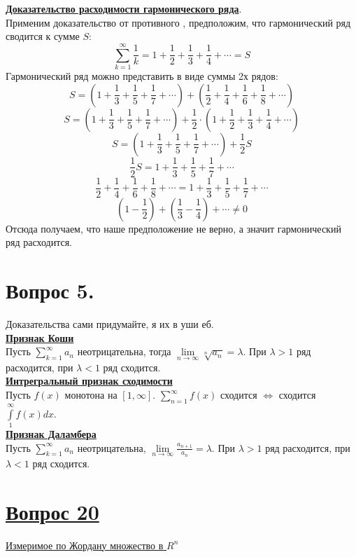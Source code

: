 \documentclass{report}
\begin{document}
\textbf{\uline{Доказательство расходимости гармонического ряда}}.\\
Применим доказательство от противного , предположим, что гармонический ряд сводится к сумме $S$:
$$\sum\limits_{k = 1}^\infty \frac{1}{k} = 1 + \frac{1}{2} + \frac{1}{3} + \frac{1}{4} + \cdots = S$$
Гармонический ряд можно представить в виде суммы 2х рядов:
$$S = (1 + \frac{1}{3} + \frac{1}{5} + \frac{1}{7} + \cdots) + (\frac{1}{2} + \frac{1}{4} + \frac{1}{6} + \frac{1}{8} + \cdots)$$
$$S = (1 + \frac{1}{3} + \frac{1}{5} + \frac{1}{7} + \cdots) + \frac{1}{2} \cdot (1 + \frac{1}{2} + \frac{1}{3} + \frac{1}{4} + \cdots)$$
$$S = (1 + \frac{1}{3} + \frac{1}{5} + \frac{1}{7} + \cdots) + \frac{1}{2}S$$
$$\frac{1}{2}S = 1 + \frac{1}{3} + \frac{1}{5} + \frac{1}{7} + \cdots$$
$$\frac{1}{2} + \frac{1}{4} + \frac{1}{6} + \frac{1}{8} + \cdots = 1 + \frac{1}{3} + \frac{1}{5} + \frac{1}{7} + \cdots$$
$$(1 - \frac{1}{2}) + (\frac{1}{3} - \frac{1}{4}) + \cdots \ne 0$$
Отсюда получаем, что наше предположение не верно, а значит гармонический ряд расходится.

\newpage
\section{Вопрос 5.}
Доказательства сами придумайте, я их в уши еб.\\

\textbf{\uline{Признак Коши}}\\
Пусть $\sum\limits_{k = 1}^\infty a_n$ неотрицательна, тогда $\lim\limits_{n \to \infty} \sqrt[n]{a_n} = \lambda$. При $\lambda > 1$ ряд расходится, при $\lambda < 1$ ряд сходится.\\

\textbf{\uline{Интрегральный признак сходимости}}\\
Пусть $f(x)$ монотона на $[1, \infty]$. $\sum\limits_{n = 1}^\infty f(x)$ сходится $\Leftrightarrow$ сходится $\int\limits_{1}^\infty f(x) dx$.\\

\textbf{\uline{Признак Даламбера}}\\
Пусть $\sum\limits_{k = 1}^\infty a_n$ неотрицательна, $\lim\limits_{n \to \infty} \frac{a_{n+1}}{a_n} = \lambda$. При $\lambda > 1$ ряд расходится, при $\lambda < 1$ ряд сходится.\\

\newpage
\section{\underline{Вопрос 20}}
\underline{Измеримое по Жордану множество в $R^{n}$}\\
\end{document}

